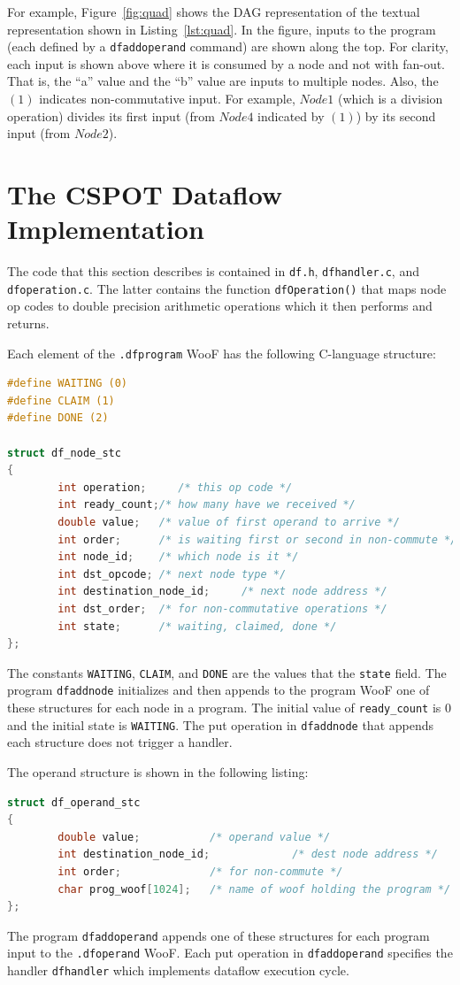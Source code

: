 \documentclass[10pt]{article}
\begin{document}
For example, Figure~\ref{fig:quad} shows the DAG representation of the textual
representation shown in Listing~\ref{lst:quad}.
In the figure, inputs to the program (each defined by a \verb+dfaddoperand+
command) are shown along the top.  For clarity, each input is shown above
where it is consumed by a node and not with fan-out.  
That is, the ``a'' value and the ``b'' value are inputs to multiple nodes.
Also, the $(1)$ indicates non-commutative input.  For example, $Node 1$ (which
is a division operation) divides its first input (from $Node 4$ indicated by
$(1)$) by its second input (from $Node 2$).


\section{The CSPOT Dataflow Implementation}

The code that this section describes is contained in \verb+df.h+,
\verb+dfhandler.c+, and \verb+dfoperation.c+.  The latter contains the function
\verb+dfOperation()+
that maps node op codes to double precision arithmetic operations which it then performs
and returns.

Each element of the \verb+.dfprogram+ WooF has the following C-language
structure:
\begin{lstlisting}[language=C,caption={C structure for node WooF},label={lst:node}]
#define WAITING (0)
#define CLAIM (1)
#define DONE (2)

struct df_node_stc
{
        int operation;     /* this op code */
        int ready_count;/* how many have we received */
        double value;   /* value of first operand to arrive */
        int order;      /* is waiting first or second in non-commute */
        int node_id;    /* which node is it */
        int dst_opcode; /* next node type */
        int destination_node_id;     /* next node address */
        int dst_order;  /* for non-commutative operations */
        int state;      /* waiting, claimed, done */
};
\end{lstlisting}
The constants \verb+WAITING+, \verb+CLAIM+, and \verb+DONE+ are the values
that the \verb+state+ field.  The program \verb+dfaddnode+ initializes and
then appends to the program WooF one of these structures for each node in a
program.  The initial value of \verb+ready_count+ is $0$ and the initial state
is \verb+WAITING+.  The put operation in \verb+dfaddnode+ that appends each
structure does not trigger a handler.

The operand structure is shown in the following listing:
\begin{lstlisting}[language=C,caption={C structure for operand WooF},label={lst:operand}]
struct df_operand_stc
{
        double value;           /* operand value */
        int destination_node_id;             /* dest node address */
        int order;              /* for non-commute */
        char prog_woof[1024];   /* name of woof holding the program */
};
\end{lstlisting}
The program \verb+dfaddoperand+ appends one of these structures for each
program input to the \verb+.dfoperand+ WooF.  Each put operation in
\verb+dfaddoperand+ specifies the handler \verb+dfhandler+ which implements
dataflow execution cycle. 
\end{document}
